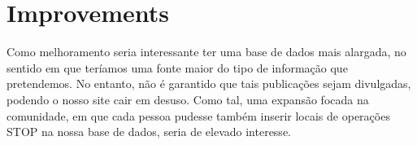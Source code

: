 \documentclass[12pt]{article}
\begin{document}
\newpage
\section{Improvements}
Como melhoramento seria interessante ter uma base de dados mais alargada, no sentido em que teríamos uma fonte maior do tipo de informação que pretendemos. No entanto, não é garantido que tais publicações sejam divulgadas, podendo o nosso site cair em desuso. Como tal, uma expansão focada na comunidade, em que cada pessoa pudesse também inserir locais de operações STOP na nossa base de dados, seria de elevado interesse.
\newpage
\iffalse
\section{Resources}
\subsection{\it{Bibliography}}
\begin{description}
\item Visual Studio 2013 Ultimate, Microsoft, \url{http://www.visualstudio.com/}.
\end{description}
\subsection{\it{Software}}
\begin{description}
\item Visual Studio 2013 Ultimate, Microsoft, \url{http://www.visualstudio.com/}.
\end{description}

\newpage

\begin{appendices}
\section{Appendix}
The contents...
\end{appendices}
\fi
\end{document}
